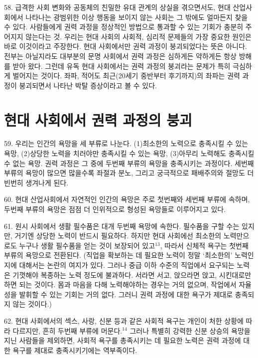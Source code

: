 \documentclass[11pt,a4paper]{article}
\begin{document}
\begin{multicols}{2}
58. 급격한 사회 변화와 공동체의 친밀한 유대 관계의 상실을 겪으면서도, 현대 산업사회에서 나타나는  광범위한 이상 행동을 보이지 않는 사회는 그 밖에도 얼마든지 찾을 수 있다. 사람들에게 권력 과정을  정상적인 방법으로 통과할 수 있는 기회가 충분히 주어지지 않는다는 것. 우리는 현대 사회의 사회적,  심리적 문제들의 가장 중요한 원인은 바로 이것이라고 주장한다. 현대 사회에서만 권력 과정이  붕괴되었다는 뜻은 아니다. 전부는 아닐지라도 대부분의 문명 사회에서 권력 과정은 심하게든 약하게든 항상 방해를 받아 왔다. 그런데 유독 현대 사회에서는 권력 과정의 붕괴라는 문제가 특히 극심하게  벌어지는 것이다. 좌파, 적어도 최근(20세기 중반부터 후기까지)의 좌파는 권력 과정이 붕괴되면서  나타난 박탈 증상이라고 볼 수 있다. 


\section*{현대 사회에서 권력 과정의 붕괴} 
59. 우리는 인간의 욕망을 세 부류로 나눈다. (1)최소한의 노력으로 충족시킬 수 있는 욕망, (2)상당한  노력을 치러야만 충족시킬 수 있는 욕망, (3)아무리 노력해도 충족시킬 수 없는 욕망. 권력 과정은 그 중에  두번째 부류의 욕망을 충족시키는 과정이다. 세번째 부류의 욕망이 많으면 많을수록 좌절과 분노, 그리고  궁극적으로 패배주의와 절망도 더 빈번히 생겨나게 된다. 


60. 현대 산업사회에서 자연적인 인간의 욕망은 주로 첫번째와 세번째 부류에 속하며, 두번째 부류의  욕망은 점점 더 인위적으로 형성된 욕망들로 이루어지고 있다. 


61. 원시 사회에서 생활 필수품은 대개 두번째 욕망에 속한다. 필수품을 구할 수는 있지만, 거기엔 상당한 노력이 반드시 필요하다. 하지만 현대 사회에선 최소한의 노력만으로도 누구나 생활 필수품을 얻는 것이  보장되어 있고\hyperlink{13}{$^{13}$}, 따라서 신체적 욕구는 첫번째 부류의 욕망으로 전환된다. (직업을 확보하는 데 필요한  노력이 정말 `최소한의' 노력인지에 대해서는 논란의 여지가 있다. 그러나 중급 이하 수준의 직업에서  요구되는 노력은 기껏해야 복종하는 노력 정도에 불과하다. 서라면 서고, 앉으라면 앉고, 시킨대로만 하면 되는 것이다. 몸과 마음을 다해 노력해야하는 경우는 거의 없으며, 작업에서 자율성을 발휘할 수 있는  기회는 거의 없다. 그러니 권력 과정에 대한 욕구가 제대로 충족되지 않는 것이다.) 


62. 현대 사회에서의 섹스, 사랑, 신분 등과 같은 사회적 욕구는 개인이 처한 상황에 따라 다르지만, 흔히  두번째 부류에 머문다.\hyperlink{14}{$^{14}$} 그러나 특별히 강력한 신분 상승의 욕망을 지닌 사람들을 제외하면, 사회적  욕구를 총족시키는 데 필요한 노력은 권력 과정에 대한 욕구를 제대로 충족시키기에는 역부족이다. 



\end{multicols}
\end{document}
